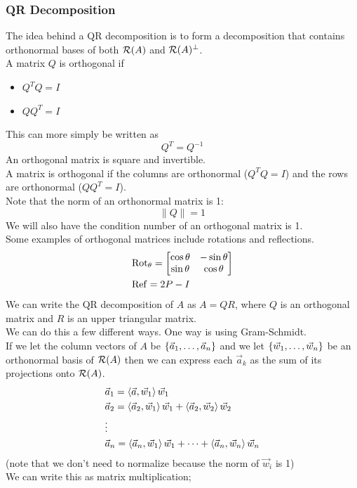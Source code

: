 \documentclass[11pt, fleqn]{article}
\begin{document}
\subsubsection{QR Decomposition}
The idea behind a QR decomposition is to form a decomposition that contains orthonormal bases of both $\mathcal{R}(A)$ and $\mathcal{R}(A)^\perp$.\\
A matrix $Q$ is orthogonal if
\begin{itemize}
    \item $Q^TQ=I$
    \item $QQ^T=I$
\end{itemize}
This can more simply be written as
$$Q^T=Q^{-1}$$
An orthogonal matrix is square and invertible.\\
A matrix is orthogonal if the columns are orthonormal ($Q^TQ=I$) and the rows are orthonormal ($QQ^T=I$).\\
Note that the norm of an orthonormal matrix is 1:
$$\|Q\|=1$$
We will also have the condition number of an orthogonal matrix is 1.\\
Some examples of orthogonal matrices include rotations and reflections.
\begin{align*}
    &\mathrm{Rot}_\theta=\matrixx{\cos\theta & -\sin\theta\\ \sin\theta & \cos\theta}\\
    &\mathrm{Ref}=2P-I
\end{align*}
We can write the QR decomposition of $A$ as $A=QR$, where $Q$ is an orthogonal matrix and $R$ is an upper triangular matrix.\\
We can do this a few different ways. One way is using Gram-Schmidt.\\
If we let the column vectors of $A$ be $\left\{ \vec{a}_1,\ldots,\vec{a}_n \right\}$ and we let $\left\{ \vec{w}_1,\ldots,\vec{w}_n \right\}$ be an orthonormal basis of $\mathcal{R}(A)$ then we can express each $\vec{a}_k$ as the sum of its projections onto $\mathcal{R}(A)$.
\begin{align*}
    &\vec{a}_1=\left\langle \vec{a},\vec{w}_1 \right\rangle\vec{w}_1\\
    &\vec{a}_2=\left\langle \vec{a}_2,\vec{w}_1 \right\rangle\vec{w}_1+\left\langle \vec{a}_2,\vec{w}_2 \right\rangle\vec{w}_2\\
    &\vdots\\
    &\vec{a}_n=\left\langle \vec{a}_n,\vec{w}_1 \right\rangle\vec{w}_1+\cdots+\left\langle \vec{a}_n,\vec{w}_n \right\rangle\vec{w}_n
\end{align*}
(note that we don't need to normalize because the norm of $\vec{w}_i$ is 1)\\
We can write this as matrix multiplication;
\end{document}
